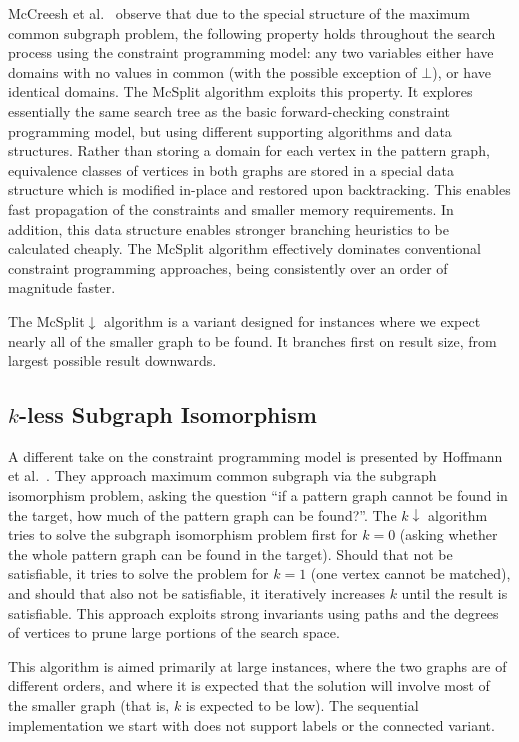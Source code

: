 \documentclass{llncs}
\begin{document}
McCreesh et al.\ \cite{o:McCreeshPT17} observe that due to the special structure of the maximum
common subgraph problem, the following property holds throughout the search process using the
constraint programming model: any two variables either have domains with no values in common (with
the possible exception of $\bot$), or have identical domains. The McSplit algorithm exploits this
property. It explores essentially the same search tree as the basic forward-checking constraint
programming model, but using different supporting algorithms and data structures.  Rather than
storing a domain for each vertex in the pattern graph, equivalence classes of vertices in both
graphs are stored in a special data structure which is modified in-place and restored upon
backtracking. This enables fast propagation of the constraints and smaller memory requirements. In
addition, this data structure enables stronger branching heuristics to be calculated cheaply. The
McSplit algorithm effectively dominates conventional constraint programming approaches, being
consistently over an order of magnitude faster.

The McSplit$\downarrow$ algorithm is a variant designed for instances where we expect nearly all of
the smaller graph to be found. It branches first on result size, from largest possible result
downwards.

\subsection{$k$-less Subgraph Isomorphism}

A different take on the constraint programming model is presented by
Hoffmann et al.\ \cite{DBLP:conf/aaai/HoffmannMR17}. They approach maximum common subgraph via the
subgraph isomorphism problem, asking the question ``if a pattern graph cannot be found in the
target, how much of the pattern graph can be found?''. The $k{\downarrow}$ algorithm tries to solve
the subgraph isomorphism problem first for $k=0$ (asking whether the whole pattern graph can be found in the
target). Should that not be satisfiable, it tries to solve the problem for $k=1$ (one vertex cannot
be matched), and should that also not be satisfiable, it iteratively increases $k$ until the result
is satisfiable. This approach exploits strong invariants using paths and the degrees of vertices to
prune large portions of the search space.

This algorithm is aimed primarily at large instances, where the two graphs are of different orders,
and where it is expected that the solution will involve most of the smaller graph (that is, $k$ is
expected to be low). The sequential implementation we start with does not support labels or the
connected variant.
\end{document}
